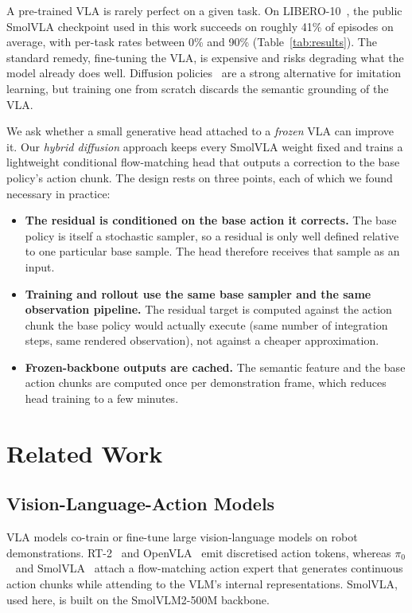 \documentclass[conference]{IEEEtran}
\begin{document}
A pre-trained VLA is rarely perfect on a given task. On LIBERO-10~\cite{libero}, the public SmolVLA checkpoint used in this work succeeds on roughly 41\% of episodes on average, with per-task rates between 0\% and 90\% (Table~\ref{tab:results}). The standard remedy, fine-tuning the VLA, is expensive and risks degrading what the model already does well. Diffusion policies~\cite{diffusionpolicy} are a strong alternative for imitation learning, but training one from scratch discards the semantic grounding of the VLA.

We ask whether a small generative head attached to a \emph{frozen} VLA can improve it. Our \emph{hybrid diffusion} approach keeps every SmolVLA weight fixed and trains a lightweight conditional flow-matching head that outputs a correction to the base policy's action chunk. The design rests on three points, each of which we found necessary in practice:
\begin{itemize}
    \item \textbf{The residual is conditioned on the base action it corrects.} The base policy is itself a stochastic sampler, so a residual is only well defined relative to one particular base sample. The head therefore receives that sample as an input.
    \item \textbf{Training and rollout use the same base sampler and the same observation pipeline.} The residual target is computed against the action chunk the base policy would actually execute (same number of integration steps, same rendered observation), not against a cheaper approximation.
    \item \textbf{Frozen-backbone outputs are cached.} The semantic feature and the base action chunks are computed once per demonstration frame, which reduces head training to a few minutes.
\end{itemize}

\section{Related Work}
\subsection{Vision-Language-Action Models}
VLA models co-train or fine-tune large vision-language models on robot demonstrations. RT-2~\cite{rt2} and OpenVLA~\cite{openvla} emit discretised action tokens, whereas $\pi_0$~\cite{pi0} and SmolVLA~\cite{smolvla} attach a flow-matching action expert that generates continuous action chunks while attending to the VLM's internal representations. SmolVLA, used here, is built on the SmolVLM2-500M backbone.
\end{document}
